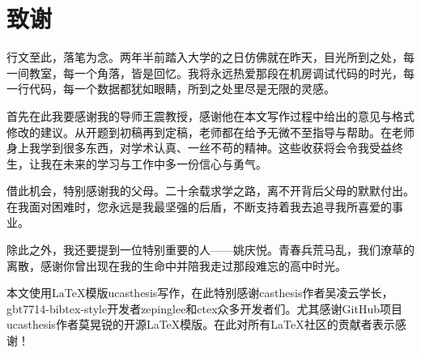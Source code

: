 \chapter[致谢]{致\quad 谢}%

行文至此，落笔为念。两年半前踏入大学的之日仿佛就在昨天，目光所到之处，每一间教室，每一个角落，皆是回忆。我将永远热爱那段在机房调试代码的时光，每一行代码，每一个数据都犹如眼睛，所到之处里尽是无限的灵感。

首先在此我要感谢我的导师王震教授，感谢他在本文写作过程中给出的意见与格式修改的建议。从开题到初稿再到定稿，老师都在给予无微不至指导与帮助。在老师身上我学到很多东西，对学术认真、一丝不苟的精神。这些收获将会令我受益终生，让我在未来的学习与工作中多一份信心与勇气。

借此机会，特别感谢我的父母。二十余载求学之路，离不开背后父母的默默付出。在我面对困难时，您永远是我最坚强的后盾，不断支持着我去追寻我所喜爱的事业。

除此之外，我还要提到一位特别重要的人——姚庆悦。青春兵荒马乱，我们潦草的离散，感谢你曾出现在我的生命中并陪我走过那段难忘的高中时光。

本文使用\LaTeX{}模版ucasthesis写作，在此特别感谢casthesis作者吴凌云学长，gbt7714-bibtex-style开发者zepinglee和ctex众多开发者们。尤其感谢GitHub项目ucasthesis作者莫晃锐的开源\LaTeX{}模版。在此对所有\LaTeX{}社区的贡献者表示感谢！





